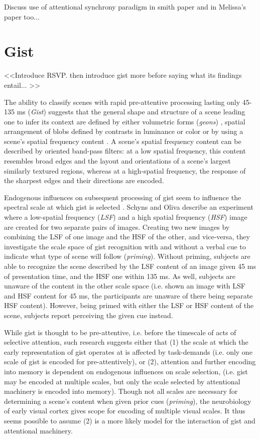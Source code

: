 \documentclass[a4paper,11pt,final]{ThesisStyle}
\begin{document}
Discuss use of attentional synchrony paradigm in smith paper and in Melissa's paper too...

\section{Gist}
\label{sec:gist}

<<Introduce RSVP. then introduce gist more before saying what its findings entail... >>

The ability to classify scenes with rapid pre-attentive processing lasting only 45-135 ms (\textit{Gist}) \cite{Potter1969,Biederman1974,Potter1976,Schyns1994,Henderson1999} suggests that the general shape and structure of a scene leading one to infer its context are defined by either volumetric forms (\textit{geons}) \cite{Biederman1987}, spatial arrangement of blobs defined by contrasts in luminance or color \cite{Schyns1994,Oliva1997} or by using a scene's spatial frequency content \cite{Oliva2001,Oliva2005}.  A scene's spatial frequency content can be described by oriented band-pass filters: at a low spatial frequency, this content resembles broad edges and the layout and orientations of a scene's largest similarly textured regions, whereas at a high-spatial frequency, the response of the sharpest edges and their directions are encoded.  

Endogenous influences on subsequent processing of gist seem to influence the spectral scale at which gist is selected \cite{Schyns1994,Oliva1997}.  Schyns and Oliva describe an experiment where a low-spatial frequency (\textit{LSF}) and a high spatial frequency (\textit{HSF}) image are created for two separate pairs of images.  Creating two new images by combining the LSF of one image and the HSF of the other, and vice-versa, they investigate the scale space of gist recognition with and without a verbal cue to indicate what type of scene will follow (\textit{priming}).  Without priming, subjects are able to recognize the scene described by the LSF content of an image given 45 ms of presentation time, and the HSF one within 135 ms.  As well, subjects are unaware of the content in the other scale space (i.e. shown an image with LSF and HSF content for 45 ms, the participants are unaware of there being separate HSF content).  However, being primed with either the LSF or HSF content of the scene, subjects report perceiving the given cue instead.  

While gist is thought to be pre-attentive, i.e. before the timescale of acts of selective attention, such research suggests either that (1) the scale at which the early representation of gist operates at is affected by task-demands (i.e. only one scale of gist is encoded for pre-attentively), or (2), attention and further encoding into memory is dependent on endogenous influences on scale selection, (i.e. gist may be encoded at multiple scales, but only the scale selected by attentional machinery is encoded into memory).  Though not all scales are necessary for determining a scene's content when given prior cues (\textit{priming}), the neurobiology of early visual cortex gives scope for encoding of multiple visual scales.  It thus seems possible to assume (2) is a more likely model for the interaction of gist and attentional machinery.
\end{document}

